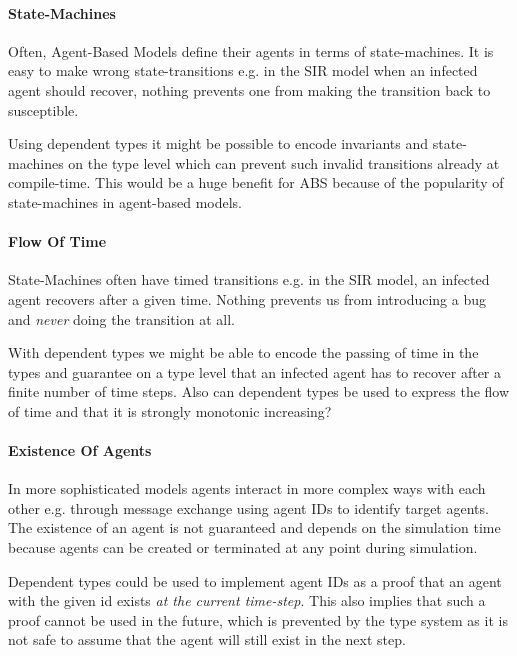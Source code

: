 \paragraph{State-Machines}
Often, Agent-Based Models define their agents in terms of state-machines. It is easy to make wrong state-transitions e.g. in the SIR model when an infected agent should recover, nothing prevents one from making the transition back to susceptible. 

Using dependent types it might be possible to encode invariants and state-machines on the type level which can prevent such invalid transitions already at compile-time. This would be a huge benefit for ABS because of the popularity of state-machines in agent-based models.

\paragraph{Flow Of Time}
State-Machines often have timed transitions e.g. in the SIR model, an infected agent recovers after a given time. Nothing prevents us from introducing a bug and \textit{never} doing the transition at all.

With dependent types we might be able to encode the passing of time in the types and guarantee on a type level that an infected agent has to recover after a finite number of time steps. Also can dependent types be used to express the flow of time and that it is strongly monotonic increasing?
	
\paragraph{Existence Of Agents}
In more sophisticated models agents interact in more complex ways with each other e.g. through message exchange using agent IDs to identify target agents. The existence of an agent is not guaranteed and depends on the simulation time because agents can be created or terminated at any point during simulation. 

Dependent types could be used to implement agent IDs as a proof that an agent with the given id exists \textit{at the current time-step}. This also implies that such a proof cannot be used in the future, which is prevented by the type system as it is not safe to assume that the agent will still exist in the next step. %
\\

